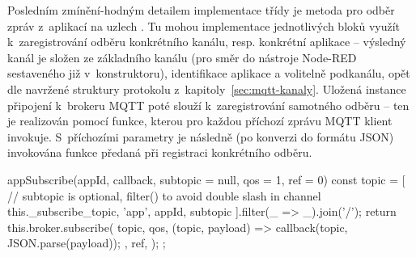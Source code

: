 Posledním zmínění-hodným detailem implementace třídy  je metoda pro odběr zpráv z~aplikací na uzlech
.
Tu mohou implementace jednotlivých bloků využít k~zaregistrování odběru konkrétního kanálu, resp. konkrétní aplikace
-- výsledný kanál je složen ze základního kanálu (pro směr do nástroje Node-RED sestaveného již v~konstruktoru),
identifikace aplikace  a volitelně podkanálu, opět dle navržené struktury protokolu z~kapitoly~\ref{sec:mqtt-kanaly}.
Uložená instance připojení k~brokeru MQTT poté slouží k~zaregistrování samotného odběru -- ten je realizován pomocí
funkce, kterou pro každou příchozí zprávu MQTT klient invokuje.
S~příchozími parametry je následně (po konverzi do formátu JSON) invokována funkce předaná při registraci konkrétního
odběru.

\begin{code}[
    language=Javascript,
    label=code:fis-node-app-subscribe,
    caption={Detail z~implementace třídy \ic{FisNode} -- metoda \ic{appSubscribe} je určená k~zaregistrování odběru
    kanálu odpovídajícího konkrétní aplikaci na konkrétním uzlu.
    Parametr \ic{qos} slouží k~nastavení konkrétní QoS pro tento odběr, \ic{ref} je volitelná identifikace
    odběru s pomocí které lze mazat konkrétní odběry.}
]
appSubscribe(appId, callback, subtopic = null, qos = 1, ref = 0) {
    const topic = [
        // subtopic is optional, filter() to avoid double slash in channel
        this._subscribe_topic, 'app', appId, subtopic
    ].filter(_ => _).join('/');
    return this.broker.subscribe(
        topic,
        qos,
        (topic, payload) => {
            callback(topic, JSON.parse(payload));
        },
        ref,
    );
};
\end{code}

